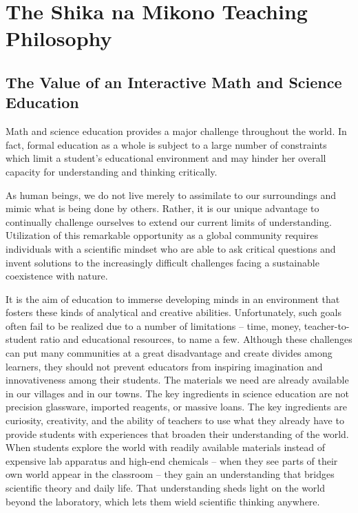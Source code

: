 \clearpage
{}
{}
\chapter*{The Shika na Mikono Teaching \hfill \\ Philosophy}

\section*{The Value of an Interactive Math and Science Education}

Math and science education provides a major challenge throughout the world. In fact, formal education as a whole is subject to a large number of constraints which limit a student's educational environment and may hinder her overall capacity for understanding and thinking critically.

As human beings, we do not live merely to assimilate to our surroundings and mimic what is being done by others. Rather, it is our unique advantage to continually challenge ourselves to extend our current limits of understanding. Utilization of this remarkable opportunity as a global community requires individuals with a scientific mindset who are able to ask critical questions and invent solutions to the increasingly difficult challenges facing a sustainable coexistence with nature.

It is the aim of education to immerse developing minds in an environment that fosters these kinds of analytical and creative abilities. Unfortunately, such goals often fail to be realized due to a number of limitations – time, money, teacher-to-student ratio and educational resources, to name a few. Although these challenges can put many communities at a great disadvantage and create divides among learners, they should not prevent educators from inspiring imagination and innovativeness among their students. The materials we need are already available in our villages and in our towns. The key ingredients in science education are not precision glassware, imported reagents, or massive loans. The key ingredients are curiosity, creativity, and the ability of teachers to use what they already have to provide students with experiences that broaden their understanding of the world. When students explore the world with readily available materials instead of expensive lab apparatus and high-end chemicals -- when they see parts of their own world appear in the classroom -- they gain an understanding that bridges scientific theory and daily life. That understanding sheds light on the world beyond the laboratory, which lets them wield scientific thinking anywhere.

